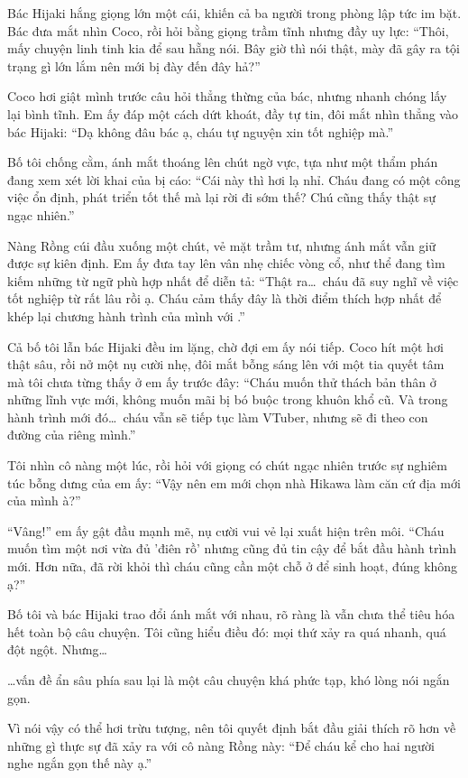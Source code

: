 \documentclass[../main.tex]{subfiles}
\begin{document}
Bác Hijaki hắng giọng lớn một cái, khiến cả ba người trong phòng lập tức im bặt. Bác đưa mắt nhìn Coco, rồi hỏi bằng giọng trầm tĩnh nhưng đầy uy lực: ``Thôi, mấy chuyện linh tinh kia để sau hẵng nói. Bây giờ thì nói thật, mày đã gây ra tội trạng gì lớn lắm nên mới bị đày đến đây hả?''

Coco hơi giật mình trước câu hỏi thẳng thừng của bác, nhưng nhanh chóng lấy lại bình tĩnh. Em ấy đáp một cách dứt khoát, đầy tự tin, đôi mắt nhìn thẳng vào bác Hijaki: ``Dạ không đâu bác ạ, cháu tự nguyện xin tốt nghiệp mà.''

Bố tôi chống cằm, ánh mắt thoáng lên chút ngờ vực, tựa như một thẩm phán đang xem xét lời khai của bị cáo: ``Cái này thì hơi lạ nhỉ. Cháu đang có một công việc ổn định, phát triển tốt thế mà lại rời đi sớm thế? Chú cũng thấy thật sự ngạc nhiên.''

Nàng Rồng cúi đầu xuống một chút, vẻ mặt trầm tư, nhưng ánh mắt vẫn giữ được sự kiên định. Em ấy đưa tay lên vân nhẹ chiếc vòng cổ, như thể đang tìm kiếm những từ ngữ phù hợp nhất để diễn tả: ``Thật ra\dots\ cháu đã suy nghĩ về việc tốt nghiệp từ rất lâu rồi ạ. Cháu cảm thấy đây là thời điểm thích hợp nhất để khép lại chương hành trình của mình với \hll.''

Cả bố tôi lẫn bác Hijaki đều im lặng, chờ đợi em ấy nói tiếp. Coco hít một hơi thật sâu, rồi nở một nụ cười nhẹ, đôi mắt bỗng sáng lên với một tia quyết tâm mà tôi chưa từng thấy ở em ấy trước đây: ``Cháu muốn thử thách bản thân ở những lĩnh vực mới, không muốn mãi bị bó buộc trong khuôn khổ cũ. Và trong hành trình mới đó\dots\ cháu vẫn sẽ tiếp tục làm VTuber, nhưng sẽ đi theo con đường của riêng mình.''

Tôi nhìn cô nàng một lúc, rồi hỏi với giọng có chút ngạc nhiên trước sự nghiêm túc bỗng dưng của em ấy: ``Vậy nên em mới chọn nhà Hikawa làm căn cứ địa mới của mình à?''

``Vâng!'' em ấy gật đầu mạnh mẽ, nụ cười vui vẻ lại xuất hiện trên môi. ``Cháu muốn tìm một nơi vừa đủ 'điên rồ' nhưng cũng đủ tin cậy để bắt đầu hành trình mới. Hơn nữa, đã rời khỏi \hll thì cháu cũng cần một chỗ ở để sinh hoạt, đúng không ạ?''

Bố tôi và bác Hijaki trao đổi ánh mắt với nhau, rõ ràng là vẫn chưa thể tiêu hóa hết toàn bộ câu chuyện. Tôi cũng hiểu điều đó: mọi thứ xảy ra quá nhanh, quá đột ngột. Nhưng\dots

\dots vấn đề ẩn sâu phía sau lại là một câu chuyện khá phức tạp, khó lòng nói ngắn gọn.

Vì nói vậy có thể hơi trừu tượng, nên tôi quyết định bắt đầu giải thích rõ hơn về những gì thực sự đã xảy ra với cô nàng Rồng này: ``Để cháu kể cho hai người nghe ngắn gọn thế này ạ.''
\end{document}
